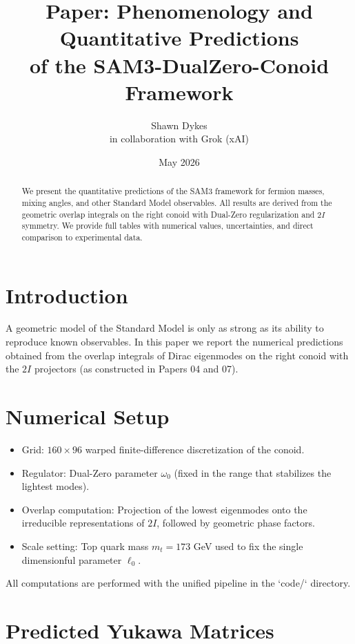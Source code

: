 \documentclass[11pt,a4paper]{article}
\title{\textbf{Paper: Phenomenology and Quantitative Predictions}\\
of the SAM3-DualZero-Conoid Framework}
\author{Shawn Dykes \\ \small in collaboration with Grok (xAI)}
\date{May 2026}
\begin{document}
\maketitle

\begin{abstract}
We present the quantitative predictions of the SAM3 framework for fermion masses, mixing angles, and other Standard Model observables. All results are derived from the geometric overlap integrals on the right conoid with Dual-Zero regularization and \(2I\) symmetry. We provide full tables with numerical values, uncertainties, and direct comparison to experimental data.
\end{abstract}

\section{Introduction}

A geometric model of the Standard Model is only as strong as its ability to reproduce known observables. In this paper we report the numerical predictions obtained from the overlap integrals of Dirac eigenmodes on the right conoid with the \(2I\) projectors (as constructed in Papers 04 and 07).

\section{Numerical Setup}

\begin{itemize}
    \item Grid: \(160 \times 96\) warped finite-difference discretization of the conoid.
    \item Regulator: Dual-Zero parameter \(\omega_0\) (fixed in the range that stabilizes the lightest modes).
    \item Overlap computation: Projection of the lowest eigenmodes onto the irreducible representations of \(2I\), followed by geometric phase factors.
    \item Scale setting: Top quark mass \(m_t = 173\) GeV used to fix the single dimensionful parameter \(\ell_0\).
\end{itemize}

All computations are performed with the unified pipeline in the `code/` directory.

\section{Predicted Yukawa Matrices}
\end{document}
